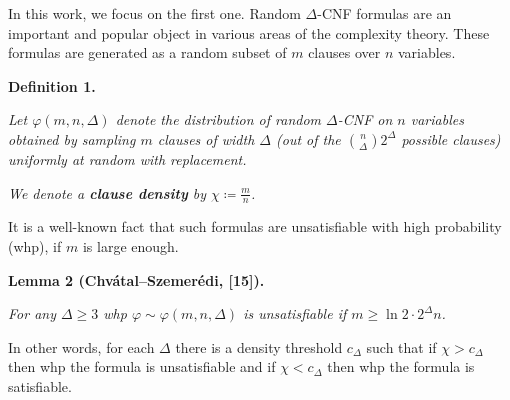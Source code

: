 In this work, we focus on the first one. Random $\Delta$-CNF formulas are an important and popular
object in various areas of the complexity
theory. These formulas are generated as a random subset of $m$ clauses over $n$ variables.\par





\par\medskip\noindent\textbf{
\textbf{Definition 1}\textbf{.}
}\par



\emph{Let $\varphi(m,n,\Delta)$ denote the distribution of random $\Delta$-CNF on $n$ variables
obtained by sampling $m$ clauses of width $\Delta$ (out of the $\binom{n}{\Delta}2^{\Delta}$
possible clauses) uniformly at random with replacement.}\par




\emph{We denote a \textbf{clause density} by $\chi\coloneqq\frac{m}{n}$.}\par






It is a well-known fact that such formulas are unsatisfiable with high probability (whp), if $m$ is large
enough.\par





\par\medskip\noindent\textbf{
\textbf{Lemma 2}\textbf{ }(Chvátal–Szemerédi, [15])\textbf{.}
}\par



\emph{For any $\Delta\geq 3$ whp $\varphi\sim\varphi(m,n,\Delta)$ is unsatisfiable if $m\geq\ln 2\cdot 2^{\Delta}n$.}\par






In other words, for each $\Delta$ there is a density threshold $c_{\Delta}$ such that if $\chi>c_{\Delta}$ then whp the formula is unsatisfiable and if $\chi<c_{\Delta}$ then whp the formula is
satisfiable.\par




